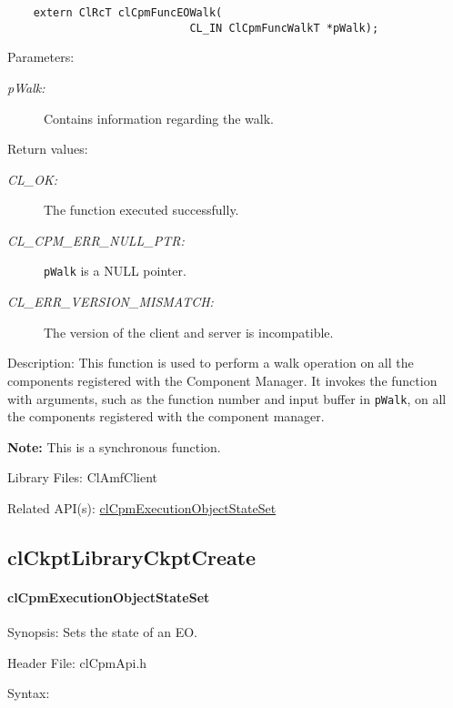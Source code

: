 {\begin{Desc}
\footnotesize\begin{verbatim}    extern ClRcT clCpmFuncEOWalk(
                			CL_IN ClCpmFuncWalkT *pWalk);
\end{verbatim}
\normalsize
\end{Desc}
\begin{Desc}
\item[Parameters:]
\begin{description}
\item[{\em p\-Walk:}]Contains information regarding the walk.\end{description}
\end{Desc}
\begin{Desc}
\item[Return values:]
\begin{description}
\item[{\em CL\_\-OK:}]The function executed successfully. 
\item[{\em CL\_\-CPM\_\-ERR\_\-NULL\_\-PTR:}]{\tt{pWalk}} is a NULL pointer. 
\item[{\em CL\_\-ERR\_\-VERSION\_\-MISMATCH:}]The version of the client and server is incompatible.\end{description}
\end{Desc}
\begin{Desc}
\item[Description:]This function is used to perform a walk operation on all the components registered with the Component Manager. It invokes the function 
with arguments, such as the function number and input buffer in {\tt{p\-Walk}}, on all the components registered with the component manager.\end{Desc}
{\bf Note:} This is a synchronous function.
\begin{Desc}
\item[Library Files:]Cl\-Amf\-Client\end{Desc}
\begin{Desc}
\item[Related API(s):]\hyperlink{group__group14}{cl\-Cpm\-Execution\-Object\-State\-Set} \end{Desc}
\newpage




\subsection{clCkptLibraryCkptCreate}
\hypertarget{pagecpm103}{}\paragraph{cl\-Cpm\-Execution\-Object\-State\-Set}\label{pagecpm103}
\begin{Desc}
\item[Synopsis:]Sets the state of an EO.\end{Desc}
\begin{Desc}
\item[Header File:]clCpmApi.h\end{Desc}
\begin{Desc}
\item[Syntax:]


\end{Desc}}
